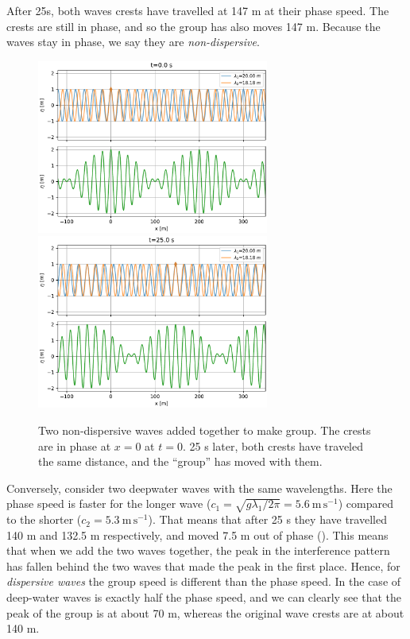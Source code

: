 After 25s, both waves crests have travelled at 147 m at their phase speed.  The crests are still in phase, and so the group has also moves 147 m.  Because the waves stay in phase, we say they are \emph{non-dispersive}.  

\begin{figure}[hbt]
  \begin{center}
    \includegraphics[width=3in]{figs/Waves/InterferingWavesNonDisp00.pdf}
    \includegraphics[width=3in]{figs/Waves/InterferingWavesNoNDisp25.pdf}
    \caption{Two non-dispersive waves added together to make group.  The crests are in phase at $x=0$ at $t=0$.  25 s later, both crests have traveled the same distance, and the ``group'' has moved with them.}
    \label{fig:InterferingWavesNonDisp}  
  \end{center}
\end{figure}

Conversely, consider two deepwater waves with the same wavelengths.  Here the phase speed is faster for the longer wave ($c_1 = \sqrt{ g \lambda_1 / 2 \pi} = 5.6\ \mathrm{m\,s^{-1}}$) compared to the shorter ($c_2 = 5.3\ \mathrm{m\,s^{-1}}$).  That means that after 25 s they have travelled 140 m and 132.5 m respectively, and moved 7.5 m out of phase ().  This means that when we add the two waves together, the peak in the interference pattern has fallen behind the two waves that made the peak in the first place.  Hence, for \emph{dispersive waves} the group speed is different than the phase speed. In the case of deep-water waves is exactly half the phase speed, and we can clearly see that the peak of the group is at about 70 m, whereas the original wave crests are at about 140 m.  

